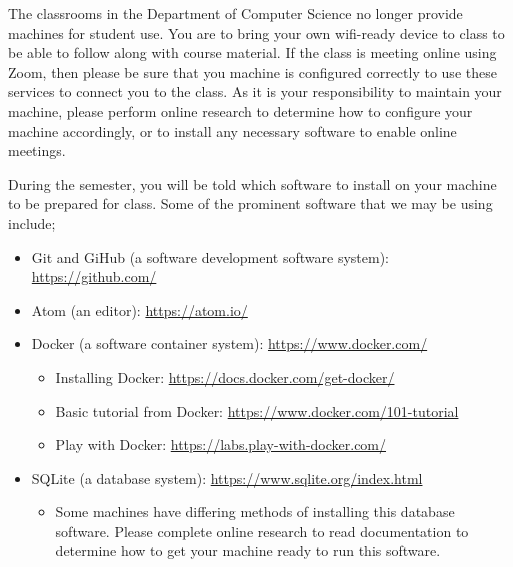 \documentclass[11pt]{article} %
\begin{document}
The classrooms in the Department of Computer Science no longer provide machines for student use. You are to bring your own wifi-ready device to class to be able to follow along with course material. If the class is meeting online using Zoom, then please be sure that you machine is configured correctly to use these services to connect you to the class. As it is your responsibility to maintain your machine, please perform online research to determine how to configure your machine accordingly, or to install any necessary software to enable online meetings. 

During the semester, you will be told which software to install on your machine to be prepared for class. Some of the prominent software that we may be using include;

\begin{itemize}
\item Git and GiHub (a software development software system): \url{https://github.com/}
\item Atom (an editor): \url{https://atom.io/}
\item Docker (a software container system): \url{https://www.docker.com/}
	\begin{itemize}
		\item Installing Docker: \url{https://docs.docker.com/get-docker/}
		\item Basic tutorial from Docker: \url{https://www.docker.com/101-tutorial}
		\item Play with Docker: \url{https://labs.play-with-docker.com/}
	\end{itemize}
	\item SQLite (a database system): \url{https://www.sqlite.org/index.html}
	\begin{itemize}
		\item Some machines have differing methods of installing this database software. Please complete online research to read documentation to determine how to get your machine ready to run this software. 
	\end{itemize}
\end{itemize}











\vspace{-.10in}
\end{document}
